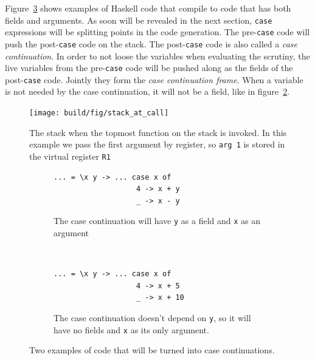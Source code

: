 Figure~\ref{fig:field_and_arguments} shows examples of Haskell code
that compile to code that has both fields and arguments. As soon will
be revealed in the next section, \texttt{case} expressions will be
splitting points in the code generation. The pre-\texttt{case} code will
push the post-\texttt{case} code on the stack. The post-\texttt{case}
code is also called a \emph{case continuation}. In order to not loose
the variables when evaluating the scrutiny, the live variables from
the pre-\texttt{case} code will be pushed along as the fields of the
post-\texttt{case} code. Jointly they form the \emph{case continuation
frame}. When a variable is not needed by the case continuation, it
will not be a field, like in figure~\ref{fig:no_fields}.

\begin{figure}
\begin{mdframed}
  \texttt{[image: build/fig/stack\_at\_call]}
  \caption{The stack when the topmost function on the stack is invoked.  In
    this example we pass the first argument by register, so \texttt{arg 1} is
    stored in the virtual register \texttt{R1}}
  \label{fig:stack_at_call}
\end{mdframed}
\end{figure}

\begin{figure}
\begin{mdframed}
        \begin{subfigure}[t]{0.5\textwidth}
          \begin{verbatim}
... = \x y -> ... case x of
                   4 -> x + y
                   _ -> x - y
          \end{verbatim}
          \caption{The case continuation will have \texttt{y} as a field
and \texttt{x} as an argument}
        \end{subfigure}
    ~ %
        \begin{subfigure}[t]{0.5\textwidth}
          \begin{verbatim}
... = \x y -> ... case x of
                   4 -> x + 5
                   _ -> x + 10
          \end{verbatim}
          \caption{The case continuation doesn't depend on \texttt{y}, so it
            will have no fields and \texttt{x} as its only argument.}
          \label{fig:no_fields}
        \end{subfigure}
  \caption{Two examples of code that will be turned into case
continuations.}
  \label{fig:field_and_arguments}
\end{mdframed}
\end{figure}

